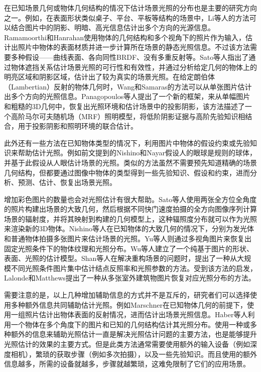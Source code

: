 在已知场景几何或物体几何结构的情况下估计场景光照的分布也是主要的研究方向之一。例如，在表面形状类似桌子、平台、平板等结构的场景中，Li等人\cite{li2003multiple}的方法可以结合图片中的阴影、明暗、高光信息估计出多个方向的光源信息。Ramamoorthi和Hanrahan\cite{ramamoorthi2001signal}使用物体的几何结构和多个视角下的照片作为输入，估计出照片中物体的表面材质并进一步计算所在场景的静态光照信息。不过该方法需要多种假设——曲线表面、各向同性BRDF、没有多重反射等。Sato等人\cite{sato2003illumination}指出了通过物体遮挡关系估计场景光照的可行性和有效性，并通过分析给定几何的物体上的明亮区域和阴影区域，估计出了较为真实的场景光照。在给定朗伯体（Lambertian）反射的物体几何时，Wang和Samaras\cite{wang2002estimation}的方法可以从单张图片估计出多个方向的光照信息。Panagopoulos等人\cite{panagopoulos2011illumination}提出了一个新的框架，来从单幅图片和粗糙的3D几何中，恢复出光照环境和估计场景中的投影阴影，该方法描述了一个高阶马尔可夫随机场（MRF）照明模型，将低阶阴影证据与高阶先验知识相结合，用于投影阴影和照明环境的联合估计。


此外还有一些方法在已知物体类型的情况下，利用图片中物体的假设约束或先验知识来帮助估计光照。例如前文提到的Nishino和Nayar\cite{nishino2004eyes}假设人的眼球是规则的球体，并基于此假设从人眼估计场景的光照。类似的方法\cite{barron2015shape, lopez2010compositing}虽然不需要预先知道精确的场景几何结构，但都要通过图像中物体的类型得到一些先验知识、假设和约束，进而分析、预测、估计、恢复出场景光照。

增加彩色图片的数量也会对光照估计有很大帮助。Sato等人\cite{sato1999acquiring}使用两张全方位全角度的照片构建出场景的大致几何，然后根据不同快门速度拍摄的全方向图像序列计算场景的辐射度，并将其映射到构建的几何模型上，这种辐照度分布就可以作为光照来渲染新的3D物体。Nishino等人\cite{nishino2001determining, nishino2005re}在已知物体的大致几何的情况下，分别为发光体和普通物体拍摄多张图片来估计场景的光照。Yu等人\cite{yu2006sparse}则通过多视角图片来恢复出固定光照条件下的物体纹理和光照分布。Wu等人\cite{wu2011high}建立了一个纯基于图片的形状、表面、光照的估计模型。Shan等人\cite{shan2013visual}在解决重构场景的问题时，提出了一种从大规模不同光照条件图片集中估计结点反照率和光照参数的方法。受到该方法的启发，Lalonde和Matthews\cite{lalonde2014lighting}提出了一种从多张室外建筑物图片恢复对应光照分布的方法。

需要注意的是，以上几种增加辅助信息的方式并不是互斥的，研究者们可以选择使用多种额外信息共同辅助估计光照。例如Marschner\cite{marschner1997inverse}在已知物体几何的前提下，使用一组照片估计出物体表面的反射情况，进而估计出场景光照信息。Haber等人\cite{haber2009relighting}利用一个物体在多个角度下的图片和已知的几何结构估计其光照分布。使用一种或多种额外的信息来辅助光照估计一直是解决光照估计问题的主要方法，也是能够提升光照估计的效果的主要方式。但是此类方法通常需要使用额外的输入设备（例如深度相机），繁琐的获取步骤（例如多次拍摄），以及一些先验知识。而且使用的额外信息越多，所需的设备就越多，步骤就越繁琐，这难免限制了它们的应用场景。

